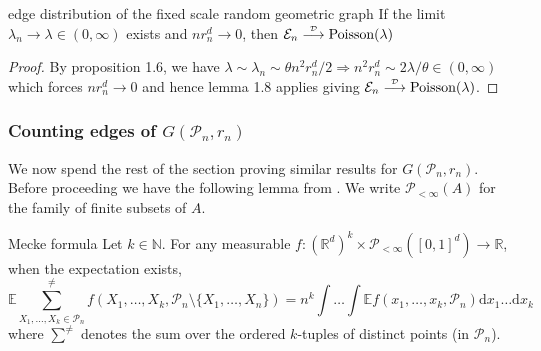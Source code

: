\documentclass{article}
\newcommand\indist{\stackrel{\mathclap{\tiny\mbox{$\mathcal{D}$}}}{\longrightarrow}}
\begin{document}
\begin{corollary}[]{edge distribution of the fixed scale random geometric graph}
    If the limit $\lambda_n \to \lambda \in (0,\infty)$ exists and $nr_n^d \to 0$, then 
    $\mathcal{E}_n \indist \text{Poisson}(\lambda)$
\end{corollary}

\begin{proof}
    By proposition 1.6, we have $\lambda \sim \lambda_n \sim \theta n^2 r_n^d/2 \Rightarrow n^2 r_n^d \sim 2\lambda/\theta 
    \in (0, \infty)$ which forces $n r_n^d \to 0$ and hence lemma 1.8 applies giving $\mathcal{E}_n \indist \text{Poisson}(\lambda)$.
\end{proof}

\subsubsection*{Counting edges of $G(\mathcal{P}_n, r_n)$}

We now spend the rest of the section proving similar results for $G(\mathcal{P}_n, r_n)$. Before proceeding we have
the following lemma from \cite{Penrose_et_al_2016}. We write $\mathcal{P}_{< \infty}(A)$ for the family of finite subsets of $A$. 

\begin{lemma}[]{Mecke formula}
    Let $k \in \mathbb{N}$. For any measurable $f: (\mathbb{R}^d)^k \times \mathcal{P}_{< \infty}([0,1]^d) \to \mathbb{R}$, 
    when the expectation exists, 
    \[\mathbb{E}\sum_{X_1, \dots, X_k \in \mathcal{P}_n}^{\neq} f(X_1, \dots, X_k, \mathcal{P}_n \setminus \{X_1, \dots, X_n\})
    = n^k \int \dots \int \mathbb{E}f(x_1, \dots, x_k, \mathcal{P}_n)\mathrm{d}x_1 \dots \mathrm{d}x_k\]
    where $\sum^{\neq}$ denotes the sum over the ordered $k$-tuples of distinct points (in $\mathcal{P}_n$).
\end{lemma}
\end{document}
